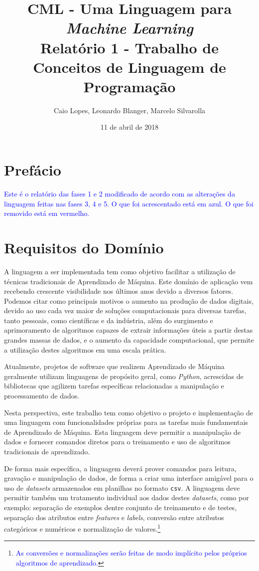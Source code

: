 \documentclass[12pt]{article}
\title{CML - Uma Linguagem para {\it Machine Learning} \\ \Large Relatório 1 \blu{versão final} - Trabalho de Conceitos de Linguagem de Programação}
\author{Caio Lopes, Leonardo Blanger, Marcelo Silvarolla}
\date{11 de abril de 2018}
\newcommand{\blu}{\textcolor{blue}}
\begin{document}
\maketitle
\section{Prefácio}
\blu{Este é o relatório das fases 1 e 2 modificado de acordo com as alterações da linguagem feitas nas fases 3, 4 e 5. O que foi acrescentado está em azul. O que foi removido está em vermelho.}

\section{Requisitos do Domínio}

A linguagem a ser implementada tem como objetivo facilitar a utilização de técnicas tradicionais de Aprendizado de Máquina. Este domínio de aplicação vem recebendo crescente visibilidade nos últimos anos devido a diversos fatores. Podemos citar como principais motivos o aumento na produção de dados digitais, devido ao uso cada vez maior de soluções computacionais para diversas tarefas, tanto pessoais, como científicas e da indústria, além do surgimento e aprimoramento de algoritmos capazes de extrair informações úteis a partir destas grandes massas de dados, e o aumento da capacidade computacional, que permite a utilização destes algoritmos em uma escala prática.

Atualmente, projetos de software que realizem Aprendizado de Máquina geralmente utilizam linguagens de propósito geral, como {\it Python}, acrescidas de bibliotecas que agilizem tarefas específicas relacionadas a manipulação e processamento de dados.

Nesta perspectiva, este trabalho tem como objetivo o projeto e implementação de uma linguagem com funcionalidades próprias para as tarefas mais fundamentais de Aprendizado de Máquina. Esta linguagem deve permitir a manipulação de dados e fornecer comandos diretos para o treinamento e uso de algoritmos tradicionais de aprendizado.

De forma mais específica, a linguagem deverá prover comandos para leitura, gravação e manipulação de dados, de forma a criar uma interface amigável para o uso de {\it datasets} armazenados em planilhas no formato {\tt csv}. A linguagem deve permitir também um tratamento individual aos dados destes {\it datasets}, como por exemplo: separação de exemplos dentre conjunto de treinamento e de testes, separação dos atributos entre {\it features} e {\it labels}, conversão entre atributos categóricos e numéricos e normalização de valores.\footnote{\blu{As conversões e normalizações serão feitas de modo implícito pelos próprios algoritmos de aprendizado.}}
\end{document}
